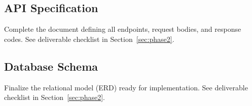 \subsection{API Specification}\label{sec:api-spec}
Complete the document defining all endpoints, request bodies, and response codes.
See deliverable checklist in Section~\ref{sec:phase2}.

\subsection{Database Schema}\label{sec:database-schema}
Finalize the relational model (ERD) ready for implementation.
See deliverable checklist in Section~\ref{sec:phase2}.
